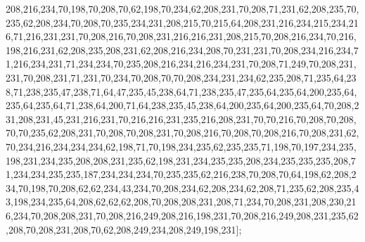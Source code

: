 208,216,234,70,198,70,208,70,62,198,70,234,62,208,231,70,208,71,231,62,208,235,70,235,62,208,234,70,208,70,235,234,231,208,215,70,215,64,208,231,216,234,215,234,216,71,216,231,231,70,208,216,70,208,231,216,216,231,208,215,70,208,216,234,70,216,198,216,231,62,208,235,208,231,62,208,216,234,208,70,231,231,70,208,234,216,234,71,216,234,231,71,234,234,70,235,208,216,234,216,234,231,70,208,71,249,70,208,231,231,70,208,231,71,231,70,234,70,208,70,70,208,234,231,234,62,235,208,71,235,64,238,71,238,235,47,238,71,64,47,235,45,238,64,71,238,235,47,235,64,235,64,200,235,64,235,64,235,64,71,238,64,200,71,64,238,235,45,238,64,200,235,64,200,235,64,70,208,231,208,231,45,231,216,231,70,216,216,231,235,216,208,231,70,70,216,70,208,70,208,70,70,235,62,208,231,70,208,70,208,231,70,208,216,70,208,70,208,216,70,208,231,62,70,234,216,234,234,234,62,198,71,70,198,234,235,62,235,235,71,198,70,197,234,235,198,231,234,235,208,208,231,235,62,198,231,234,235,235,208,234,235,235,235,208,71,234,234,235,235,187,234,234,234,70,235,235,62,216,238,70,208,70,64,198,62,208,234,70,198,70,208,62,62,234,43,234,70,208,234,62,208,234,62,208,71,235,62,208,235,43,198,234,235,64,208,62,62,62,208,70,208,208,231,208,71,234,70,208,231,208,230,216,234,70,208,208,231,70,208,216,249,208,216,198,231,70,208,216,249,208,231,235,62,208,70,208,231,208,70,62,208,249,234,208,249,198,231];
 

